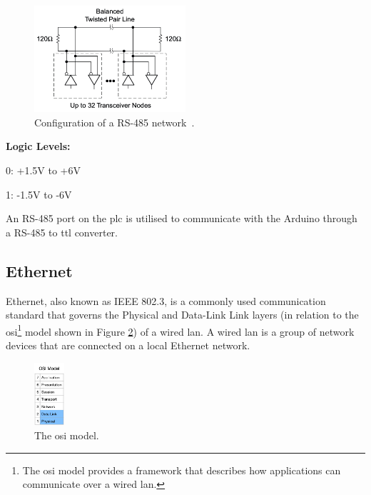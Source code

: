         \begin{figure}[H]
            \centering
            \includegraphics[width = 0.5\textwidth]{2_images/rs485Nodes.png}
            \caption{Configuration of a RS-485 network~\cite{frenzel2015handbook}.}
            \label{fig:rs485Nodes}
        \end{figure}        
       
       
        \begin{description}
            \item\textbf{Logic Levels:}
            \item0: +1.5V to +6V
            \item1: -1.5V to -6V
        \end{description}       
       
        An RS-485 port on the \acrshort{plc} is utilised to communicate with the Arduino through a RS-485 to \acrshort{ttl} converter.
     
\newpage    
\subsection{Ethernet}
    Ethernet, also known as IEEE 802.3, is a commonly used communication standard that governs the Physical and Data-Link Link layers (in relation to the \acrshort{osi}\footnote{The \acrshort{osi} model provides a framework that describes how applications can communicate over a wired \acrshort{lan}\cite{scott2021networking}.} model shown in Figure \ref{fig:osi}) of a wired \acrshort{lan}\cite{scott2021networking}. A wired \acrfull{lan} is a group of network devices that are connected on a local Ethernet network.  
    
        \begin{figure}[H]
            \centering
            \includegraphics[width = 0.1\textwidth]{2_images/osi.png}
            \caption{The \acrshort{osi} model\cite{scott2021networking}.}
            \label{fig:osi}
        \end{figure} 
    
